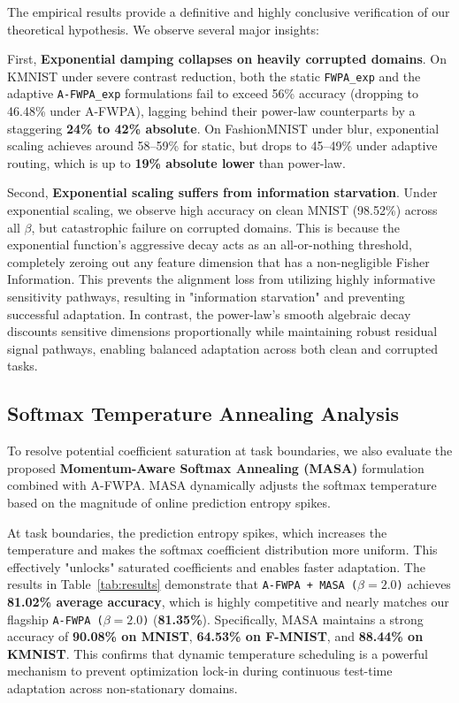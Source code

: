 \documentclass{article}
\theoremstyle{plain}
\theoremstyle{definition}
\theoremstyle{remark}
\begin{document}
The empirical results provide a definitive and highly conclusive verification of our theoretical hypothesis. We observe several major insights:

First, \textbf{Exponential damping collapses on heavily corrupted domains}. On KMNIST under severe contrast reduction, both the static \texttt{FWPA\_exp} and the adaptive \texttt{A-FWPA\_exp} formulations fail to exceed 56\% accuracy (dropping to 46.48\% under A-FWPA), lagging behind their power-law counterparts by a staggering \textbf{24\% to 42\% absolute}. On FashionMNIST under blur, exponential scaling achieves around 58--59\% for static, but drops to 45--49\% under adaptive routing, which is up to \textbf{19\% absolute lower} than power-law.

Second, \textbf{Exponential scaling suffers from information starvation}. Under exponential scaling, we observe high accuracy on clean MNIST (98.52\%) across all $\beta$, but catastrophic failure on corrupted domains. This is because the exponential function's aggressive decay acts as an all-or-nothing threshold, completely zeroing out any feature dimension that has a non-negligible Fisher Information. This prevents the alignment loss from utilizing highly informative sensitivity pathways, resulting in "information starvation" and preventing successful adaptation. In contrast, the power-law's smooth algebraic decay discounts sensitive dimensions proportionally while maintaining robust residual signal pathways, enabling balanced adaptation across both clean and corrupted tasks.

\subsection{Softmax Temperature Annealing Analysis}
To resolve potential coefficient saturation at task boundaries, we also evaluate the proposed \textbf{Momentum-Aware Softmax Annealing (MASA)} formulation combined with A-FWPA. MASA dynamically adjusts the softmax temperature based on the magnitude of online prediction entropy spikes.

At task boundaries, the prediction entropy spikes, which increases the temperature and makes the softmax coefficient distribution more uniform. This effectively "unlocks" saturated coefficients and enables faster adaptation. The results in Table~\ref{tab:results} demonstrate that \texttt{A-FWPA + MASA ($\beta = 2.0$)} achieves \textbf{81.02\% average accuracy}, which is highly competitive and nearly matches our flagship \texttt{A-FWPA ($\beta = 2.0$)} (\textbf{81.35\%}). Specifically, MASA maintains a strong accuracy of \textbf{90.08\% on MNIST}, \textbf{64.53\% on F-MNIST}, and \textbf{88.44\% on KMNIST}. This confirms that dynamic temperature scheduling is a powerful mechanism to prevent optimization lock-in during continuous test-time adaptation across non-stationary domains.
\end{document}
